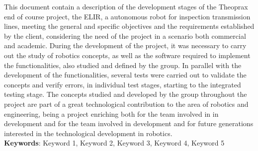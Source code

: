 \begin{thesisabastract}
 This document contain a description of the development stages of the Theoprax end of course project, the ELIR, a autonomous robot for inspection transmission lines, meeting the general and specific objectives and the requirements established by the client, considering the need of the project in a scenario both commercial and academic. During the development of the project, it was necessary to carry out the study of robotics concepts, as well as the software required to implement the functionalities, also studied and defined by the group. In parallel with the development of the functionalities, several tests were carried out to validate the concepts and verify errors, in individual test stages, starting to the integrated testing stage. 
The concepts studied and developed by the group throughout the project are part of a great technological contribution to the area of robotics and engineering, being a project enriching both for the team involved in in development and for the team involved in development and for future generations interested in the technological development in robotics.
\ \\


\textbf{Keywords}: Keyword 1, Keyword 2, Keyword 3, Keyword 4, Keyword 5

\end{thesisabastract}
